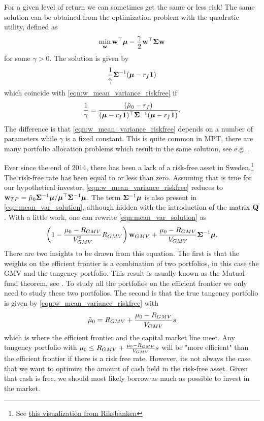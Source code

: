 \documentclass[oneside]{book}\usepackage{knitr}
\begin{document}
For a given level of return we can sometimes get the same or less risk! 
The same solution can be obtained from the optimization problem with the quadratic utility, defined as 
$$\min_{\mathbf{w}} \mathbf{w}^\top \mbox{\boldmath$\mu$} - \frac{\gamma}{2} \mathbf{w}^\top \mathbf{\Sigma} \mathbf{w}$$ 
for some $\gamma > 0$.
The solution is given by 
$$\frac{1}{\gamma}\mathbf{\Sigma}^{-1} (\mbox{\boldmath$\mu$}-r_f \mathbf{1})$$
which coincide with \eqref{eqn:w_mean_variance_riskfree} if 
$$\frac{1}{\gamma} = \frac{(\tilde\mu_0-r_f)}{(\mbox{\boldmath$\mu$}-r_f \mathbf{1})^\top \mathbf{\Sigma}^{-1} (\mbox{\boldmath$\mu$}-r_f \mathbf{1})}.$$ 
The difference is that \eqref{eqn:w_mean_variance_riskfree} depends on a number of parameters while $\gamma$ is a fixed constant.
This is quite common in MPT, there are many portfolio allocation problems which result in the same solution, see e.g. \citet{bodnar2013equivalence}.

Ever since the end of 2014, there has been a lack of a risk-free asset in Sweden.\footnote{See \href{https://www.riksbank.se/sv/statistik/sok-rantor--valutakurser/reporanta-in--och-utlaningsranta/}{this visualization from Riksbanken}} 
The risk-free rate has been equal to or less than zero. 
Assuming that is true for our hypothetical investor, \eqref{eqn:w_mean_variance_riskfree} reduces to $\mathbf{w}_{TP} = \tilde\mu_0 \mathbf{\Sigma}^{-1} \mbox{\boldmath$\mu$} / \mbox{\boldmath$\mu$}^\top \mathbf{\Sigma}^{-1} \mbox{\boldmath$\mu$}$. 
The term $\mathbf{\Sigma}^{-1} \mbox{\boldmath$\mu$}$ is also present in \eqref{eqn:mean_var_solution}, although hidden with the introduction of the matrix $\mathbf{Q}$. 
With a little work, one can rewrite \eqref{eqn:mean_var_solution} as
$$
\left(1 - \frac{\mu_0-R_{GMV}}{V_{GMV}^2} R_{GMV} \right) \mathbf{w}_{GMV} + \frac{\mu_0-R_{GMV}}{V_{GMV}} \mathbf{\Sigma}^{-1} \mbox{\boldmath$\mu$}.
$$
There are two insights to be drawn from this equation. 
The first is that the weights on the efficient frontier is a combination of two portfolios, in this case the GMV and the tangency portfolio. 
This result is usually known as the Mutual fund theorem, see \textcite{tobin1958liquidity}.
To study all the portfolios on the efficient frontier we only need to study these two portfolios. 
The second is that the true tangency portfolio is given by \eqref{eqn:w_mean_variance_riskfree} with 
$$
\tilde\mu_0 = R_{GMV} + \frac{\mu_0-R_{GMV}}{V_{GMV}} s  
$$
which is where the efficient frontier and the capital market line meet. Any tangency portfolio with $\mu_0\leq R_{GMV} + \frac{\mu_0-R_{GMV}}{V_{GMV}} s$ will be "more efficient" than the efficient frontier if there is a risk free rate. However, its not always the case that we want to optimize the amount of cash held in the risk-free asset. Given that cash is free, we should most likely borrow as much as possible to invest in the market. 
\end{document}
